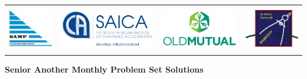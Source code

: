 \documentclass{article}
\begin{document}
\setlength{\tabcolsep}{6pt}
\begin{center} \begin{tabular}{cccc}
	\includegraphics[height=56pt]{SAMF_logo.jpg} &
	\includegraphics[height=56pt]{SAICA_logo.jpg} &
	\includegraphics[height=56pt]{OM_Logo_Stacked_Vignette_on_White_RGB.jpg} &
	\includegraphics[height=56pt]{SAMO2019.png}
\end{tabular} \end{center}


\bigskip


\begin{center}
	\textbf{\Large Senior Another Monthly Problem Set Solutions}
\end{center}
\end{document}
